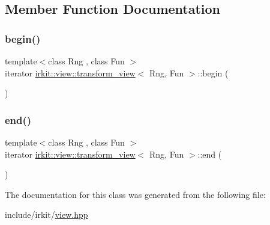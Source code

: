 \subsection{Member Function Documentation}
\mbox{\label{classirkit_1_1view_1_1transform__view_a6a4643fb239fa9ac74bbc9bfbfd806e9}} 
\subsubsection{\texorpdfstring{begin()}{begin()}}
{\footnotesize\ttfamily template$<$class Rng , class Fun $>$ \\
iterator \mbox{\hyperlink{classirkit_1_1view_1_1transform__view}{irkit\+::view\+::transform\+\_\+view}}$<$ Rng, Fun $>$\+::begin (\begin{DoxyParamCaption}{ }\end{DoxyParamCaption})\hspace{0.3cm}{\ttfamily [inline]}}

\mbox{\label{classirkit_1_1view_1_1transform__view_ad0b0e9db406e42257883d29adecce451}} 
\subsubsection{\texorpdfstring{end()}{end()}}
{\footnotesize\ttfamily template$<$class Rng , class Fun $>$ \\
iterator \mbox{\hyperlink{classirkit_1_1view_1_1transform__view}{irkit\+::view\+::transform\+\_\+view}}$<$ Rng, Fun $>$\+::end (\begin{DoxyParamCaption}{ }\end{DoxyParamCaption})\hspace{0.3cm}{\ttfamily [inline]}}



The documentation for this class was generated from the following file\+:\begin{DoxyCompactItemize}
\item 
include/irkit/\mbox{\hyperlink{view_8hpp}{view.\+hpp}}\end{DoxyCompactItemize}

